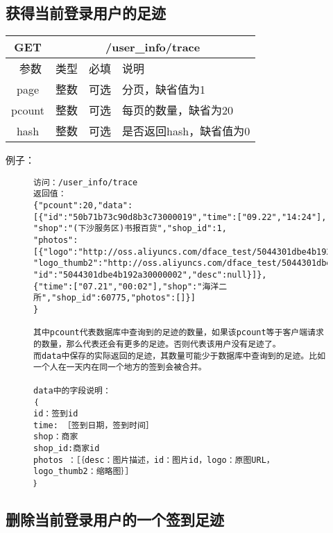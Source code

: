 \documentclass[cs4size]{ctexartutf8}
\begin{document}
\subsection{获得当前登录用户的足迹}

\begin{table}[H]
   \begin{center}
\begin{tabular}{|c|c|c|p{12cm}|}
\hline
GET & \multicolumn{3}{|c|}{/user\_info/trace} \\
\hline\hline
 \  参数  & 类型 & 必填 &  说明  \\
   \hline
 page  & 整数 & 可选 & 分页，缺省值为1\\ 
 \hline
 pcount  & 整数 & 可选 & 每页的数量，缺省为20\\ 
  \hline
 hash  & 整数 & 可选 & 是否返回hash，缺省值为0\\
 \hline
\end{tabular}
   \end{center}
\end{table}

例子：

\begin{figure}[H]
\begin{verbatim}
访问：/user_info/trace
返回值：
{"pcount":20,"data":
[{"id":"50b71b73c90d8b3c73000019","time":["09.22","14:24"],
"shop":"(下沙服务区)书报百货","shop_id":1,
"photos":[{"logo":"http://oss.aliyuncs.com/dface_test/5044301dbe4b192a30000002/0.jpg",
"logo_thumb2":"http://oss.aliyuncs.com/dface_test/5044301dbe4b192a30000002/t2_0.jpg",
"id":"5044301dbe4b192a30000002","desc":null}]},
{"time":["07.21","00:02"],"shop":"海洋二所","shop_id":60775,"photos":[]}]
}

其中pcount代表数据库中查询到的足迹的数量，如果该pcount等于客户端请求的数量，那么代表还会有更多的足迹。否则代表该用户没有足迹了。
而data中保存的实际返回的足迹，其数量可能少于数据库中查询到的足迹。比如一个人在一天内在同一个地方的签到会被合并。

data中的字段说明：
｛
id：签到id
time: ［签到日期，签到时间］
shop：商家
shop_id:商家id
photos ：［｛desc：图片描述，id：图片id，logo：原图URL，logo_thumb2：缩略图｝］
｝

\end{verbatim}
\end{figure}



\subsection{删除当前登录用户的一个签到足迹}
\end{document}
